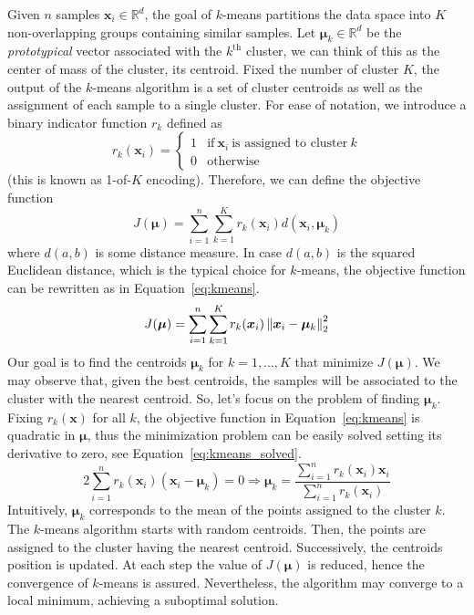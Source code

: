 	Given $n$ samples $\bm{x}_i \in \mathbb{R}^d$, the goal of $k$-means partitions the data space into $K$ non-overlapping groups containing similar samples.
    Let $\bm{\mu}_k \in \mathbb{R}^d$ be the \textit{prototypical} vector associated with the $k^{\text{th}}$ cluster, we can think of this as the center of mass of the cluster, \ie its centroid.
    Fixed the number of cluster $K$, the output of the $k$-means algorithm is a set of cluster centroids as well as the assignment of each sample to a single cluster.
    For ease of notation, we introduce a binary indicator function $r_k$ defined as
    $$
 	r_k(\bm{x}_i)=\begin{cases} 1  &\text{if}~\bm{x}_i~\text{is assigned to cluster}~k \\ 0  & \text{otherwise} \end{cases}
    $$
    (this is known as 1-of-$K$ encoding). Therefore, we can define the objective function
    $$
    J(\bm{\mu}) = \sum_{i=1}^n\sum_{k=1}^K r_k(\bm{x}_i) d(\bm{x}_i, \bm{\mu}_k)
    $$
    where $d(a,b)$ is some distance measure. In case $d(a,b)$ is the squared Euclidean distance, which is the typical choice for $k$-means, the objective function can be rewritten as in Equation~\eqref{eq:kmeans}.
    \begin{equation} \label{eq:kmeans}
    J(\bm{\mu}) = \sum_{i=1}^n\sum_{k=1}^K r_k(\bm{x}_i) \left\lVert\bm{x}_i- \bm{\mu}_k\right\rVert_2^2
    \end{equation}
    Our goal is to find the centroids $\bm{\mu}_k$ for $k=1,\dots,K$ that minimize $J(\bm{\mu})$.
    We may observe that, given the best centroids, the samples will be associated to the cluster with the nearest centroid. So, let's focus on the problem of finding $\bm{\mu}_k$.
    Fixing $r_k(\bm{x})$ for all $k$, the objective function in Equation~\eqref{eq:kmeans} is quadratic in $\bm{\mu}$, thus the minimization problem can be easily solved setting its derivative to zero, see Equation~\eqref{eq:kmeans_solved}.
    \begin{equation} \label{eq:kmeans_solved}
	2\sum_{i=1}^n r_k(\bm{x}_i)(\bm{x}_i - \bm{\mu}_k) = 0 \Rightarrow \bm{\mu}_k = \frac{\sum_{i=1}^n r_k(\bm{x}_i)\bm{x}_i}{\sum_{i=1}^nr_k(\bm{x}_i)}
    \end{equation}
    Intuitively, $\bm{\mu}_k$ corresponds to the mean of the points assigned to the cluster $k$.
    The $k$-means algorithm starts with random centroids. Then, the points are assigned to the cluster having the nearest centroid. Successively, the centroids position is updated. At each step the value of $J(\bm{\mu})$ is reduced, hence the convergence of $k$-means is assured. Nevertheless, the algorithm may converge to a local minimum, achieving a suboptimal solution.
    
